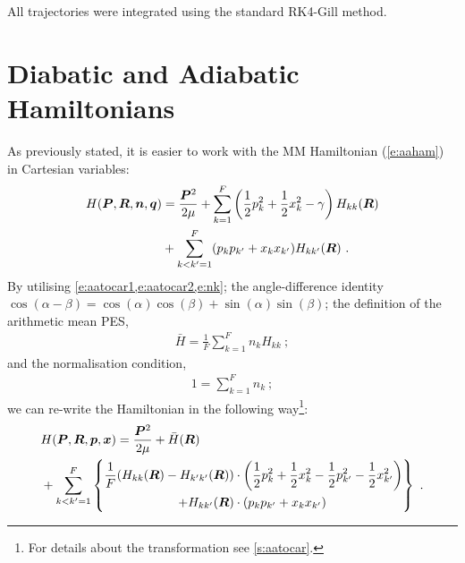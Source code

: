 All trajectories were integrated using the standard RK4-Gill method.
%
\section*{Diabatic and Adiabatic Hamiltonians}
%
As previously stated, it is easier to work with the MM Hamiltonian (\cref{e:aaham}) in Cartesian variables:
\begin{align}\label{e:cham}
H(\bm{P},\bm{R},\bm{n},\bm{q}) &= \frac{\bm{P}^{2}}{2 \mu} + \sum\limits_{k=1}^{F}
\left(
\frac{1}{2}p_{k}^{2} + \frac{1}{2}x_{k}^{2} - \gamma
\right)
H_{kk}(\bm{R})\nonumber\\
& + \sum\limits_{k<k'=1}^{F} (p_{k} p_{k'} + x_{k} x_{k'}) H_{kk'}(\bm{R})~.
\end{align}
By utilising \cref{e:aatocar1,e:aatocar2,e:nk}; the angle-difference identity $ \cos(\alpha - \beta) = \cos(\alpha)\cos(\beta) + \sin(\alpha)\sin(\beta) $; the definition of the arithmetic mean PES,
\begin{align}
\bar{H} = \frac{1}{F} \sum\limits_{k=1}^{F} n_{k}H_{kk}~;
\end{align}
and the normalisation condition,
\begin{align}
1 = \sum\limits_{k=1}^{F} n_{k}~;
\end{align}
we can re-write \cite{project} the Hamiltonian in the following way\footnote{For details about the transformation see \cref{s:aatocar}.}:
\begin{align}\label{e:def_diab_ham}
& H(\bm{P}, \bm{R}, \bm{p}, \bm{x}) =
\frac{\bm{P}^{2}}{2\mu}+\bar{H}(\bm{R}) \\
& +\sum\limits_{k<k'=1}^{F}
\left\{\begin{aligned}
\frac{1}{F} (H_{kk}(\bm{R})-H_{k'k'}(\bm{R}))&\cdot
\left(
\frac{1}{2}p_{k}^{2}+\frac{1}{2}x_{k}^{2}-\frac{1}{2}p_{k'}^{2}-\frac{1}{2}x_{k'}^{2}\right)\nonumber\\
+H_{kk'}(\bm{R})&\cdot(p_{k}p_{k'}+x_{k}x_{k'})
\end{aligned}\right\}~.
\end{align}

